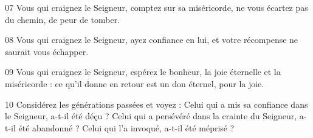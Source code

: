 
07 Vous qui craignez le Seigneur, comptez sur sa miséricorde, ne vous écartez pas du chemin, de peur de tomber.

08 Vous qui craignez le Seigneur, ayez confiance en lui, et votre récompense ne saurait vous échapper.

09 Vous qui craignez le Seigneur, espérez le bonheur, la joie éternelle et la miséricorde : ce qu’il donne en retour est un don éternel, pour la joie.

10 Considérez les générations passées et voyez : Celui qui a mis sa confiance dans le Seigneur, a-t-il été déçu ? Celui qui a persévéré dans la crainte du Seigneur, a-t-il été abandonné ? Celui qui l’a invoqué, a-t-il été méprisé ?
